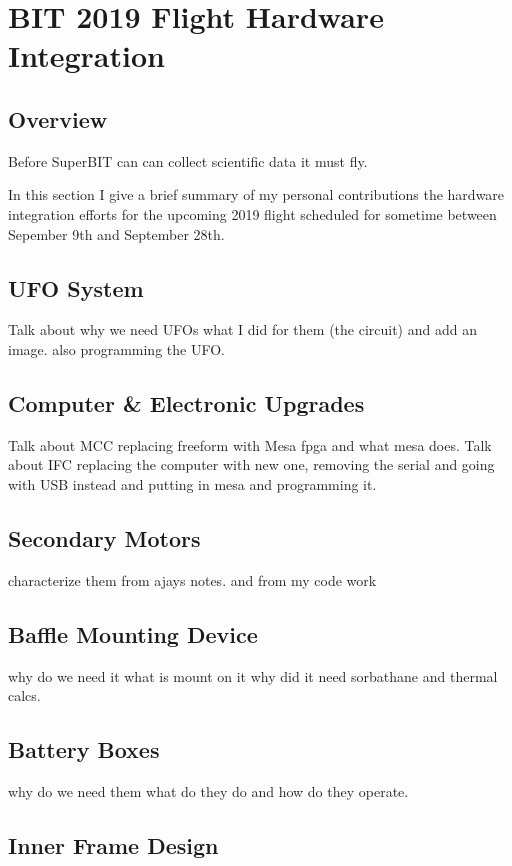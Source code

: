 \chapter{BIT 2019 Flight Hardware Integration}
\section{Overview}
Before SuperBIT can can collect scientific data it must fly. 
\par
In this section I give a brief summary of my personal contributions the hardware integration efforts for the upcoming 2019 flight scheduled for sometime between Sepember 9th and September 28th. 

\section{UFO System}
Talk about why we need UFOs what I did for them (the circuit) and add an image. also programming the UFO.

\section{Computer \& Electronic Upgrades}
Talk about MCC replacing freeform with Mesa fpga and what mesa does. 
Talk about IFC replacing the computer with new one, removing the serial and going with USB instead and putting in mesa and programming it.

\section{Secondary Motors}
characterize them from ajays notes. and from my code work

\section{Baffle Mounting Device}
why do we need it what is mount on it why did it need sorbathane and thermal calcs.

\section{Battery Boxes}
why do we need them what do they do and how do they operate.

\section{Inner Frame Design}



